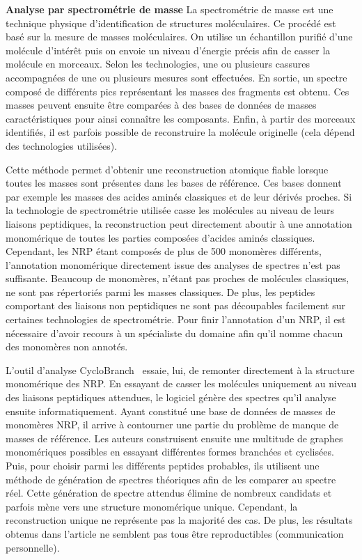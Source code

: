 \textbf{Analyse par spectrométrie de masse}
La spectrométrie de masse est une technique physique d'identification de structures moléculaires.
Ce procédé est basé sur la mesure de masses moléculaires.
On utilise un échantillon purifié d'une molécule d'intérêt puis on envoie un niveau d'énergie précis afin de casser la molécule en morceaux.
Selon les technologies, une ou plusieurs cassures accompagnées de une ou plusieurs mesures sont effectuées.
En sortie, un spectre composé de différents pics représentant les masses des fragments est obtenu.
Ces masses peuvent ensuite être comparées à des bases de données de masses caractéristiques pour ainsi connaître les composants.
Enfin, à partir des morceaux identifiés, il est parfois possible de reconstruire la molécule originelle (cela dépend des technologies utilisées).

Cette méthode permet d'obtenir une reconstruction atomique fiable lorsque toutes les masses sont présentes dans les bases de référence.
Ces bases donnent par exemple les masses des acides aminés classiques et de leur dérivés proches.
Si la technologie de spectrométrie utilisée casse les molécules au niveau de leurs liaisons peptidiques, la reconstruction peut directement aboutir à une annotation monomérique de toutes les parties composées d'acides aminés classiques.
Cependant, les NRP étant composés de plus de 500 monomères différents, l'annotation monomérique directement issue des analyses de spectres n'est pas suffisante.
Beaucoup de monomères, n'étant pas proches de molécules classiques, ne sont pas répertoriés parmi les masses classiques.
De plus, les peptides comportant des liaisons non peptidiques ne sont pas découpables facilement sur certaines technologies de spectrométrie.
Pour finir l'annotation d'un NRP, il est nécessaire d'avoir recours à un spécialiste du domaine afin qu'il nomme chacun des monomères non annotés.

L'outil d'analyse CycloBranch~\cite{novak_cyclobranch:_2015} essaie, lui, de remonter directement à la structure monomérique des NRP.
En essayant de casser les molécules uniquement au niveau des liaisons peptidiques attendues, le logiciel génère des spectres qu'il analyse ensuite informatiquement.
Ayant constitué une base de données de masses de monomères NRP, il arrive à contourner une partie du problème de manque de masses de référence.
Les auteurs construisent ensuite une multitude de graphes monomériques possibles en essayant différentes formes branchées et cyclisées.
Puis, pour choisir parmi les différents peptides probables, ils utilisent une méthode de génération de spectres théoriques afin de les comparer au spectre réel.
Cette génération de spectre attendus élimine de nombreux candidats et parfois mène vers une structure monomérique unique.
Cependant, la reconstruction unique ne représente pas la majorité des cas.
De plus, les résultats obtenus dans l'article ne semblent pas tous être reproductibles (communication personnelle).

